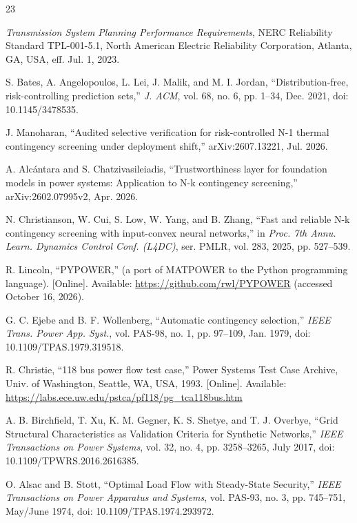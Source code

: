 \documentclass[12pt]{article}
\begin{document}
\begin{thebibliography}{23}

 \textit{Transmission System Planning Performance Requirements}, NERC Reliability Standard TPL-001-5.1, North American Electric Reliability Corporation, Atlanta, GA, USA, eff. Jul. 1, 2023.

 S. Bates, A. Angelopoulos, L. Lei, J. Malik, and M. I. Jordan, ``Distribution-free, risk-controlling prediction sets,'' \textit{J. ACM}, vol. 68, no. 6, pp. 1--34, Dec. 2021, doi: 10.1145/3478535.

 J. Manoharan, ``Audited selective verification for risk-controlled N-1 thermal contingency screening under deployment shift,'' arXiv:2607.13221, Jul. 2026.

 A. Alc\'antara and S. Chatzivasileiadis, ``Trustworthiness layer for foundation models in power systems: Application to N-k contingency screening,'' arXiv:2602.07995v2, Apr. 2026.

 N. Christianson, W. Cui, S. Low, W. Yang, and B. Zhang, ``Fast and reliable N-k contingency screening with input-convex neural networks,'' in \textit{Proc. 7th Annu. Learn. Dynamics Control Conf. (L4DC)}, ser. PMLR, vol. 283, 2025, pp. 527--539.

 R. Lincoln, ``PYPOWER,'' (a port of MATPOWER to the Python programming language). [Online]. Available: \url{https://github.com/rwl/PYPOWER} (accessed October 16, 2026).

 G. C. Ejebe and B. F. Wollenberg, ``Automatic contingency selection,'' \textit{IEEE Trans. Power App. Syst.}, vol. PAS-98, no. 1, pp. 97--109, Jan. 1979, doi: 10.1109/TPAS.1979.319518.

 R. Christie, ``118 bus power flow test case,'' Power Systems Test Case Archive, Univ. of Washington, Seattle, WA, USA, 1993. [Online]. Available: \url{https://labs.ece.uw.edu/pstca/pf118/pg_tca118bus.htm}

 A. B. Birchfield, T. Xu, K. M. Gegner, K. S. Shetye, and T. J. Overbye, ``Grid Structural Characteristics as Validation Criteria for Synthetic Networks,'' \textit{IEEE Transactions on Power Systems}, vol. 32, no. 4, pp. 3258--3265, July 2017, doi: 10.1109/TPWRS.2016.2616385.

 O. Alsac and B. Stott, ``Optimal Load Flow with Steady-State Security,'' \textit{IEEE Transactions on Power Apparatus and Systems}, vol. PAS-93, no. 3, pp. 745--751, May/June 1974, doi: 10.1109/TPAS.1974.293972.


\end{thebibliography}
\end{document}
